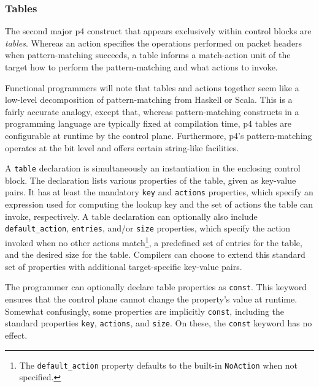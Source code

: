 \subsubsection*{Tables}

The second major \acrshort{p4} construct that appears exclusively within control
blocks are \emph{tables}. Whereas an action specifies the operations performed
on packet headers when pattern-matching succeeds, a table informs a match-action
unit of the target how to perform the pattern-matching and what actions to
invoke.

\begin{tcolorbox}[
	title={\textbf{Analogy to functional programming}},
	colback=decoration!5!white,
	colframe=decoration,
	fonttitle=\bfseries,
	arc=0pt,
	outer arc=0pt,
	boxrule=0.5pt,
	top=2pt,
	bottom=2pt,
	left=2pt,
	right=2pt,
	enlarge top by=1.5\baselineskip,
	enlarge bottom by=1.5\baselineskip
]
	Functional programmers will note that tables and actions together seem like
	a low-level decomposition of pattern-matching from Haskell or Scala. This is
	a fairly accurate analogy, except that, whereas pattern-matching constructs
	in a programming language are typically fixed at compilation time,
	\acrshort{p4} tables are configurable at runtime by the control plane.
	Furthermore, \acrshort{p4}'s pattern-matching operates at the bit level and
	offers certain string-like facilities.
\end{tcolorbox}

A \texttt{table} declaration is simultaneously an instantiation in the enclosing
control block. The declaration lists various properties of the table, given as
key-value pairs. It has at least the mandatory \texttt{key} and \texttt{actions}
properties, which specify an expression used for computing the lookup key and
the set of actions the table can invoke, respectively. A table declaration can
optionally also include \texttt{default\_action}, \texttt{entries}, and/or
\texttt{size} properties, which specify the action invoked when no other actions
match\footnote{The \texttt{default\_action} property defaults to the built-in
\texttt{NoAction} when not specified.}, a predefined set of entries for the
table, and the desired size for the table. Compilers can choose to extend this
standard set of properties with additional target-specific key-value pairs.

The programmer can optionally declare table properties as \texttt{const}. This
keyword ensures that the control plane cannot change the property's value at
runtime. Somewhat confusingly, some properties are implicitly \texttt{const},
including the standard properties \texttt{key}, \texttt{actions}, and
\texttt{size}. On these, the \texttt{const} keyword has no effect.

